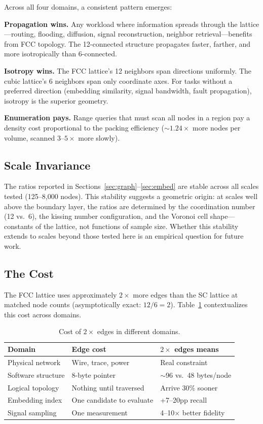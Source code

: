 \documentclass[11pt]{article}
\begin{document}
Across all four domains, a consistent pattern emerges:

\textbf{Propagation wins.} Any workload where information spreads
through the lattice---routing, flooding, diffusion, signal
reconstruction, neighbor retrieval---benefits from FCC topology.
The 12-connected structure propagates faster, farther, and more
isotropically than 6-connected.

\textbf{Isotropy wins.} The FCC lattice's 12 neighbors span
directions uniformly. The cubic lattice's 6 neighbors span only
coordinate axes. For tasks without a preferred direction (embedding
similarity, signal bandwidth, fault propagation), isotropy is the
superior geometry.

\textbf{Enumeration pays.} Range queries that must scan all nodes
in a region pay a density cost proportional to the packing
efficiency (${\sim}1.24\times$ more nodes per volume, scanned
$3$--$5\times$ more slowly).

\subsection{Scale Invariance}

The ratios reported in Sections~\ref{sec:graph}--\ref{sec:embed}
are stable across all scales tested (125--8{,}000 nodes). This
stability suggests a geometric origin: at scales well above the
boundary layer, the ratios are determined by the coordination number
(12 vs.\ 6), the kissing number configuration, and the Voronoi cell
shape---constants of the lattice, not functions of sample size. Whether
this stability extends to scales beyond those tested here is an
empirical question for future work.

\subsection{The Cost}

The FCC lattice uses approximately $2\times$ more edges than the
SC lattice at matched node counts (asymptotically exact: $12/6 = 2$).
Table~\ref{tab:cost} contextualizes this cost across domains.

\begin{table}[H]
\centering
\caption{Cost of $2\times$ edges in different domains.}
\label{tab:cost}
\begin{tabular}{lll}
\toprule
Domain & Edge cost & $2\times$ edges means \\
\midrule
Physical network & Wire, trace, power & Real constraint \\
Software structure & 8-byte pointer & ${\sim}$96 vs.\ 48 bytes/node \\
Logical topology & Nothing until traversed & Arrive 30\% sooner \\
Embedding index & One candidate to evaluate & +7--20pp recall \\
Signal sampling & One measurement & 4--10$\times$ better fidelity \\
\bottomrule
\end{tabular}
\end{table}
\end{document}
